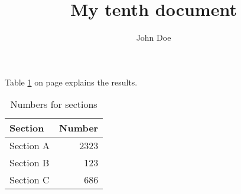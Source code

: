 \documentclass{article}
\title{My tenth document}
\author{John Doe}
\begin{document}
   \maketitle

  Table \ref{tbl:results} on page \pageref{tbl:results} explains the results.

\begin{table}[htb]
\center
\begin{tabular}{l|r}
Section & Number \\ 
\hline
Section A & 2323 \\ 
Section B & 123 \\ 
Section C & 686 \\ 
\end{tabular}
\caption{Numbers for sections}
\label{tbl:results}
\end{table}
\end{document}
